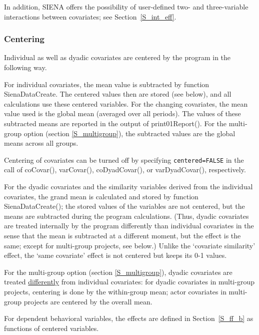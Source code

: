 \documentclass[a4paper,fleqn,11pt]{article}
\newcommand{\+}{\, + \,}
\newcommand{\sfn}[1]{\textsf{#1}}
\newcommand{\SI}{{\sf SIENA }}
\begin{document}
In addition, \SI offers the possibility of user-defined two- and three-variable
interactions between covariates; see Section~\ref{S_int_eff}.


\subsubsection{Centering}
\label{S_center}

Individual as well as dyadic covariates are centered
by the program in the following way.

For individual covariates, the mean value is subtracted
by function \sfn{SienaDataCreate}. The centered values then are stored
(see below),
and all calculations use these centered variables.
For the changing covariates, the mean
value used is the global mean (averaged over all periods).
The values of these subtracted means are reported in the output
of \sfn{print01Report()}.
For the multi-group option (section \ref{S_multigroup}),
the subtracted values are the global means across all groups.

Centering of covariates can be turned off by specifying
\texttt{centered=FALSE} in the call of \sfn{coCovar()},
\sfn{varCovar()}, \sfn{coDyadCovar()}, or \sfn{varDyadCovar()}, respectively.

For the dyadic covariates and the similarity variables derived
from the individual covariates, the grand mean is calculated
and stored by function \sfn{SienaDataCreate()};
the stored values of the variables are not centered, but the means
are subtracted during the program calculations. (Thus,
dyadic covariates are treated internally by the program differently than
individual covariates in the sense that the mean is subtracted at
a different moment, but the effect is the same; except for multi-group
projects, see below.)
Unlike the `covariate similarity' effect,
the `same covariate' effect is not centered but keeps its 0-1 values.

For the multi-group option (section \ref{S_multigroup}),
dyadic covariates are treated \underline{differently} from
individual covariates:
for dyadic covariates in multi-group projects, centering is done by the
within-group mean;
actor covariates in multi-group projects
are centered by the overall mean.

For dependent behavioral variables, the effects are defined
in Section~\ref{S_ff_b} as functions of centered variables.
\end{document}
